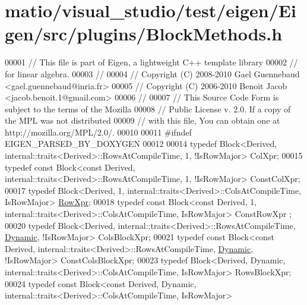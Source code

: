 \hypertarget{matio_2visual__studio_2test_2eigen_2_eigen_2src_2plugins_2_block_methods_8h_source}{}\section{matio/visual\+\_\+studio/test/eigen/\+Eigen/src/plugins/\+Block\+Methods.h}
\label{matio_2visual__studio_2test_2eigen_2_eigen_2src_2plugins_2_block_methods_8h_source}

\begin{DoxyCode}
00001 \textcolor{comment}{// This file is part of Eigen, a lightweight C++ template library}
00002 \textcolor{comment}{// for linear algebra.}
00003 \textcolor{comment}{//}
00004 \textcolor{comment}{// Copyright (C) 2008-2010 Gael Guennebaud <gael.guennebaud@inria.fr>}
00005 \textcolor{comment}{// Copyright (C) 2006-2010 Benoit Jacob <jacob.benoit.1@gmail.com>}
00006 \textcolor{comment}{//}
00007 \textcolor{comment}{// This Source Code Form is subject to the terms of the Mozilla}
00008 \textcolor{comment}{// Public License v. 2.0. If a copy of the MPL was not distributed}
00009 \textcolor{comment}{// with this file, You can obtain one at http://mozilla.org/MPL/2.0/.}
00010 
00011 \textcolor{preprocessor}{#ifndef EIGEN\_PARSED\_BY\_DOXYGEN}
00012 
00014 \textcolor{keyword}{typedef} Block<Derived, internal::traits<Derived>::RowsAtCompileTime, 1, !IsRowMajor> ColXpr;
00015 \textcolor{keyword}{typedef} \textcolor{keyword}{const} Block<const Derived, internal::traits<Derived>::RowsAtCompileTime, 1, !IsRowMajor> 
      ConstColXpr;
00017 \textcolor{keyword}{typedef} Block<Derived, 1, internal::traits<Derived>::ColsAtCompileTime, IsRowMajor> 
      \hyperlink{group___core___module_class_eigen_1_1_block}{RowXpr};
00018 \textcolor{keyword}{typedef} \textcolor{keyword}{const} Block<const Derived, 1, internal::traits<Derived>::ColsAtCompileTime, IsRowMajor> ConstRowXpr
      ;
00020 \textcolor{keyword}{typedef} Block<Derived, internal::traits<Derived>::RowsAtCompileTime, \hyperlink{namespace_eigen_ad81fa7195215a0ce30017dfac309f0b2}{Dynamic}, !IsRowMajor> 
      ColsBlockXpr;
00021 \textcolor{keyword}{typedef} \textcolor{keyword}{const} Block<const Derived, internal::traits<Derived>::RowsAtCompileTime, 
      \hyperlink{namespace_eigen_ad81fa7195215a0ce30017dfac309f0b2}{Dynamic}, !IsRowMajor> ConstColsBlockXpr;
00023 \textcolor{keyword}{typedef} Block<Derived, Dynamic, internal::traits<Derived>::ColsAtCompileTime, IsRowMajor> RowsBlockXpr;
00024 \textcolor{keyword}{typedef} \textcolor{keyword}{const} Block<const Derived, Dynamic, internal::traits<Derived>::ColsAtCompileTime, IsRowMajor> 

\end{DoxyCode}
